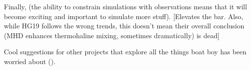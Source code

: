 Finally, (the ability to constrain simulations with observations means that it will become exciting and important to simulate more stuff). 
[Elevates the bar. Also, while HG19 follows the wrong trends, this doesn't mean their overall conclusion (MHD enhances thermohaline mixing, sometimes dramatically) is dead]
    
    

    
    
    Cool suggestions for other projects that explore all the things boat boy has been worried about (\partyparrot).

